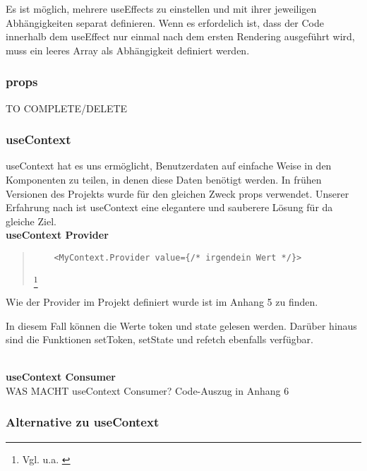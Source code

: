 \begin{flushleft}
  Es ist möglich, mehrere useEffects zu einstellen und mit ihrer jeweiligen Abhängigkeiten separat definieren.
  Wenn es erfordelich ist, dass der Code innerhalb dem useEffect nur einmal nach dem ersten Rendering ausgeführt wird, muss ein leeres Array als Abhängigkeit definiert werden.
\end{flushleft}

\subsubsection{props}
TO COMPLETE/DELETE
\subsubsection{useContext}
useContext hat es uns ermöglicht, Benutzerdaten auf einfache Weise in den Komponenten zu teilen, in denen diese Daten benötigt werden. In frühen Versionen des Projekts wurde für den gleichen Zweck props verwendet.
Unserer Erfahrung nach ist useContext eine elegantere und sauberere Lösung für da gleiche Ziel.
\\
\textbf{useContext Provider} \\
\begin{quote}
  \begin{lstlisting}
    <MyContext.Provider value={/* irgendein Wert */}>
    \end{lstlisting}

  \footnote{Vgl. u.a. \cite{R02}}
\end{quote}
Wie der Provider im Projekt definiert wurde ist im Anhang 5 zu finden.

In diesem Fall können die Werte token und state gelesen werden. Darüber hinaus sind die Funktionen setToken, setState und refetch ebenfalls verfügbar.
\\\\
\newpage

\textbf{useContext Consumer} \\
WAS MACHT useContext Consumer?
Code-Auszug in Anhang 6



\subsubsection{Alternative zu useContext}

